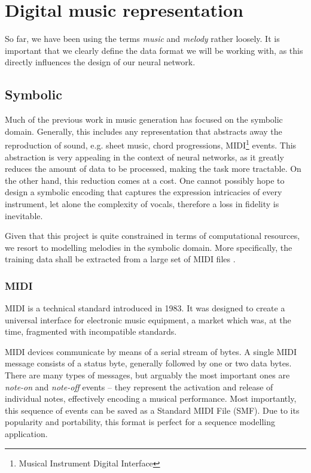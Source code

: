 \documentclass[../../report.tex]{subfiles}
\begin{document}
\section{Digital music representation}

So far, we have been using the terms \emph{music} and \emph{melody} rather
loosely. It is important that we clearly define the data format we will be
working with, as this directly influences the design of our neural network.

\subsection{Symbolic}

Much of the previous work in music generation has focused on the symbolic
domain. Generally, this includes any representation that abstracts away the
reproduction of sound, e.g. sheet music, chord progressions,
MIDI\footnote{Musical Instrument Digital Interface} events. This abstraction is
very appealing in the context of neural networks, as it greatly reduces the
amount of data to be processed, making the task more tractable. On the other
hand, this reduction comes at a cost. One cannot possibly hope to design a
symbolic encoding that captures the expression intricacies of every instrument,
let alone the complexity of vocals, therefore a loss in fidelity is inevitable.
\cite{Dieleman2020}

Given that this project is quite constrained in terms of computational
resources, we resort to modelling melodies in the symbolic domain. More
specifically, the training data shall be extracted from a large set of MIDI
files .

\subsubsection{MIDI}
MIDI is a technical standard introduced in 1983. It was designed to create a
universal interface for electronic music equipment, a market which was, at the
time, fragmented with incompatible standards.

MIDI devices communicate by means of a serial stream of bytes. A single MIDI
message consists of a status byte, generally followed by one or two data bytes.
There are many types of messages, but arguably the most important ones are
\emph{note-on} and \emph{note-off} events -- they represent the activation and
release of individual notes, effectively encoding a musical performance. Most
importantly, this sequence of events can be saved as a Standard MIDI File (SMF).
Due to its popularity and portability, this format is perfect for a sequence
modelling application. \cite{MIDI2015Messages, MIDI2015Files}
\end{document}
